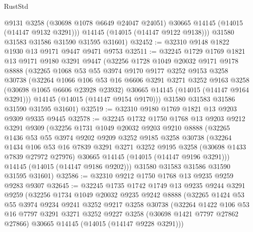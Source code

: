 \begin{lexlean}{RustStd}
\begin{coremodule}
          @9131
          @3258
          (@30698 @1078 @6649 @24047 @24051)
          @30665
          @14145
          (@14015 (@14147 @9132 @3291)))
        @14145
        (@14015 (@14147 @9122 @9138)))
      @31580
      @31583
      @31586
      @31590
      @31595
      @31601)
@32452 := @32310 @9148 @1822 @1930 @13 @9171 @9447 @9471 @9753
@32511 := @32245
    @1729
    @1769
    @1821
    @13
    @9171
    @9180
    @3291
    @9447
    (@32256
      @1728
      @1049
      @20032
      @9171
      @9178
      @8888
      (@32265
        @1068
        @53
        @55
        @3974
        @9170
        @9177
        @3252
        @9153
        @3258
        @30738
        (@32264
          @1066
          @106
          @53
          @16
          @6606
          @3291
          @3271
          @3252
          @9163
          @3258
          (@30698 @1065 @6606 @23928 @23932)
          @30665
          @14145
          (@14015 (@14147 @9164 @3291)))
        @14145
        (@14015 (@14147 @9154 @9170)))
      @31580
      @31583
      @31586
      @31590
      @31595
      @31601)
@32519 := @32310 @9180 @1769 @1821 @13 @9203 @9309 @9335 @9445
@32578 := @32245
    @1732
    @1750
    @1768
    @13
    @9203
    @9212
    @3291
    @9309
    (@32256
      @1731
      @1049
      @20032
      @9203
      @9210
      @8888
      (@32265
        @1436
        @53
        @55
        @3974
        @9202
        @9209
        @3252
        @9185
        @3258
        @30738
        (@32264
          @1434
          @106
          @53
          @16
          @7839
          @3291
          @3271
          @3252
          @9195
          @3258
          (@30698 @1433 @7839 @27972 @27976)
          @30665
          @14145
          (@14015 (@14147 @9196 @3291)))
        @14145
        (@14015 (@14147 @9186 @9202)))
      @31580
      @31583
      @31586
      @31590
      @31595
      @31601)
@32586 := @32310 @9212 @1750 @1768 @13 @9235 @9259 @9283 @9307
@32645 := @32245
    @1735
    @1742
    @1749
    @13
    @9235
    @9244
    @3291
    @9259
    (@32256
      @1734
      @1049
      @20032
      @9235
      @9242
      @8888
      (@32265
        @1424
        @53
        @55
        @3974
        @9234
        @9241
        @3252
        @9217
        @3258
        @30738
        (@32264
          @1422
          @106
          @53
          @16
          @7797
          @3291
          @3271
          @3252
          @9227
          @3258
          (@30698 @1421 @7797 @27862 @27866)
          @30665
          @14145
          (@14015 (@14147 @9228 @3291)))

\end{coremodule}
\end{lexlean}
